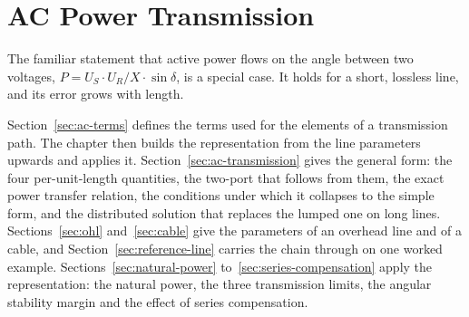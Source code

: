 \section{AC Power Transmission}
\label{sec:ac-chapter}

The familiar statement that active power flows on the angle between two
voltages, $P = U_S \cdot U_R / X \cdot \sin\delta$, is a special case. It
holds for a short, lossless line, and its error grows with length.

Section~\ref{sec:ac-terms} defines the terms used for the elements of a
transmission path. The chapter then builds the representation from the line
parameters upwards and applies it. Section~\ref{sec:ac-transmission} gives
the general form:
the four per-unit-length quantities, the two-port that follows from them,
the exact power transfer relation, the conditions under which it collapses
to the simple form, and the distributed solution that replaces the lumped
one on long lines. Sections~\ref{sec:ohl} and~\ref{sec:cable} give the
parameters of an overhead line and of a cable, and
Section~\ref{sec:reference-line} carries the chain through on one worked
example. Sections~\ref{sec:natural-power} to~\ref{sec:series-compensation}
apply the representation: the natural power, the three transmission limits,
the angular stability margin and the effect of series compensation.










